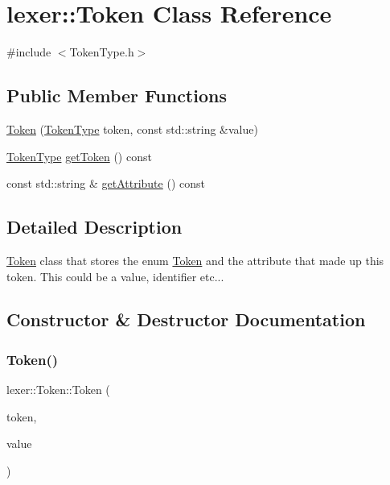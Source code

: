 \hypertarget{classlexer_1_1Token}{}\section{lexer\+:\+:Token Class Reference}
\label{classlexer_1_1Token}


{\ttfamily \#include $<$Token\+Type.\+h$>$}

\subsection*{Public Member Functions}
\begin{DoxyCompactItemize}
\item 
\hyperlink{classlexer_1_1Token_a1957043fccf9ff5053e2d16da91da677}{Token} (\hyperlink{TokenType_8h_a8609501a650c2bf52e8397c88de5770f}{Token\+Type} token, const std\+::string \&value)
\item 
\hyperlink{TokenType_8h_a8609501a650c2bf52e8397c88de5770f}{Token\+Type} \hyperlink{classlexer_1_1Token_a8375087ce4b276ed175ab3d171f76fd1}{get\+Token} () const
\item 
const std\+::string \& \hyperlink{classlexer_1_1Token_a6b50f258588b97a8087edf17ec3f2762}{get\+Attribute} () const
\end{DoxyCompactItemize}


\subsection{Detailed Description}
\hyperlink{classlexer_1_1Token}{Token} class that stores the enum \hyperlink{classlexer_1_1Token}{Token} and the attribute that made up this token. This could be a value, identifier etc... 

\subsection{Constructor \& Destructor Documentation}
\mbox{\label{classlexer_1_1Token_a1957043fccf9ff5053e2d16da91da677}} 
\subsubsection{\texorpdfstring{Token()}{Token()}}
{\footnotesize\ttfamily lexer\+::\+Token\+::\+Token (\begin{DoxyParamCaption}\item[{\hyperlink{TokenType_8h_a8609501a650c2bf52e8397c88de5770f}{lexer\+::\+Token\+Type}}]{token,  }\item[{const std\+::string \&}]{value }\end{DoxyParamCaption})}


